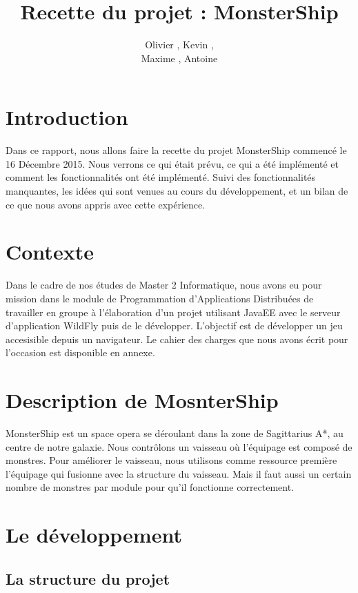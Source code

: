 \documentclass[a4paper,11pt]{report}
\title{Recette du projet : MonsterShip}
\author{Olivier \bsc{Boissard}, Kevin \bsc{Boulala},\\Maxime \bsc{Dubois}, Antoine \bsc{Lavier}}
\begin{document}
\maketitle
\setcounter{tocdepth}{1}
\tableofcontents

\chapter{Introduction}
  Dans ce rapport, nous allons faire la recette du projet MonsterShip commencé le 16 Décembre 2015. Nous verrons ce qui était prévu, ce qui a été implémenté et comment les fonctionnalités ont été implémenté. Suivi des fonctionnalités manquantes, les idées qui sont venues au cours du développement, et un bilan de ce que nous avons appris avec cette expérience.
  
\chapter{Contexte}
  Dans le cadre de nos études de Master 2 Informatique, nous avons eu pour mission dans le module de Programmation d'Applications Distribuées de travailler en groupe à l'élaboration d'un projet utilisant JavaEE avec le serveur d'application WildFly puis de le développer. L'objectif est de développer un jeu accesisible depuis un navigateur. Le cahier des charges que nous avons écrit pour l'occasion est disponible en annexe.

\chapter{Description de MosnterShip}
  MonsterShip est un space opera se déroulant dans la zone de Sagittarius A*, au centre de notre galaxie. Nous contrôlons un vaisseau où l'équipage est composé de monstres. Pour améliorer le vaisseau, nous utilisons comme ressource première l'équipage qui fusionne avec la structure du vaisseau. Mais il faut aussi un certain nombre de monstres par module pour qu'il fonctionne correctement.

\chapter{Le développement}
  \section{La structure du projet}
\end{document}
